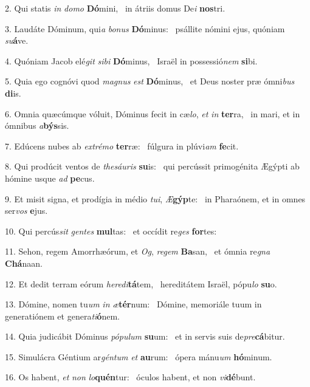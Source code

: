 2. Qui statis \textit{in} \textit{do}\textit{mo} \textbf{Dó}mini, \ast\  in átriis domus De\textit{i} \textbf{nos}tri.\

3. Laudáte Dóminum, qui\textit{a} \textit{bo}\textit{nus} \textbf{Dó}minus: \ast\  psállite nómini ejus, quóniam \textit{su}\textbf{á}ve.\

4. Quóniam Jacob elé\textit{git} \textit{si}\textit{bi} \textbf{Dó}minus, \ast\  Israël in possessió\textit{nem} \textbf{si}bi.\

5. Quia ego cognóvi quod \textit{ma}\textit{gnus} \textit{est} \textbf{Dó}minus, \ast\  et Deus noster præ ómni\textit{bus} \textbf{di}is.\

6. Omnia quæcúmque vóluit, Dóminus fecit in cæ\textit{lo}, \textit{et} \textit{in} \textbf{ter}ra, \ast\  in mari, et in ómnibus \textit{a}\textbf{býs}sis.\

7. Edúcens nubes ab \textit{ex}\textit{tré}\textit{mo} \textbf{ter}ræ: \ast\  fúlgura in plúvi\textit{am} \textbf{fe}cit.\

8. Qui prodúcit ventos de \textit{the}\textit{sáu}\textit{ris} \textbf{su}is: \ast\  qui percússit primogénita Ægýpti ab hómine usque \textit{ad} \textbf{pe}cus.\

9. Et misit signa, et prodígia in médio \textit{tu}\textit{i}, \textit{Æ}\textbf{gýp}te: \ast\  in Pharaónem, et in omnes ser\textit{vos} \textbf{e}jus.\

10. Qui percús\textit{sit} \textit{gen}\textit{tes} \textbf{mul}tas: \ast\  et occídit re\textit{ges} \textbf{for}tes:\

11. Sehon, regem Amorrhæórum, et \textit{Og}, \textit{re}\textit{gem} \textbf{Ba}san, \ast\  et ómnia re\textit{gna} \textbf{Chá}naan.\

12. Et dedit terram eórum \textit{he}\textit{re}\textit{di}\textbf{tá}tem, \ast\  hereditátem Israël, pópu\textit{lo} \textbf{su}o.\

13. Dómine, nomen tu\textit{um} \textit{in} \textit{æ}\textbf{tér}num: \ast\  Dómine, memoriále tuum in generatiónem et genera\textit{ti}\textbf{ó}nem.\

14. Quia judicábit Dóminus \textit{pó}\textit{pu}\textit{lum} \textbf{su}um: \ast\  et in servis suis de\textit{pre}\textbf{cá}bitur.\

15. Simulácra Géntium ar\textit{gén}\textit{tum} \textit{et} \textbf{au}rum: \ast\  ópera mánu\textit{um} \textbf{hó}minum.\

16. Os habent, \textit{et} \textit{non} \textit{lo}\textbf{quén}tur: \ast\  óculos habent, et non \textit{vi}\textbf{dé}bunt.\

